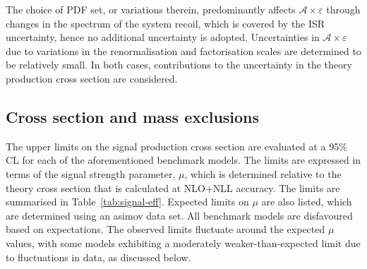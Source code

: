 The choice of PDF set, or variations therein, predominantly affects
$\mathcal{A}\times\varepsilon$ through changes in the \Pt spectrum of
the system recoil, which is covered by the ISR uncertainty, hence no
additional uncertainty is adopted. Uncertainties in
$\mathcal{A}\times\varepsilon$ due to variations in the
renormalisation and factorisation scales are determined to be
relatively small. In both cases, contributions to the uncertainty in
the theory production cross section are considered.

\subsection{Cross section and mass exclusions}

The upper limits on the signal production cross section are evaluated
at a 95\% CL for each of the aforementioned benchmark models. The
limits are expressed in terms of the signal strength parameter, $\mu$,
which is determined relative to the theory cross section that is
calculated at NLO+NLL accuracy. The limits are summarised in
Table~\ref{tab:signal-eff}. Expected limits on $\mu$ are also listed,
which are determined using an asimov data set. All benchmark models
are disfavoured based on expectations. The observed limits fluctuate
around the expected $\mu$ values, with some models exhibiting a
moderately weaker-than-expected limit due to fluctuations in data, as
discussed below.

